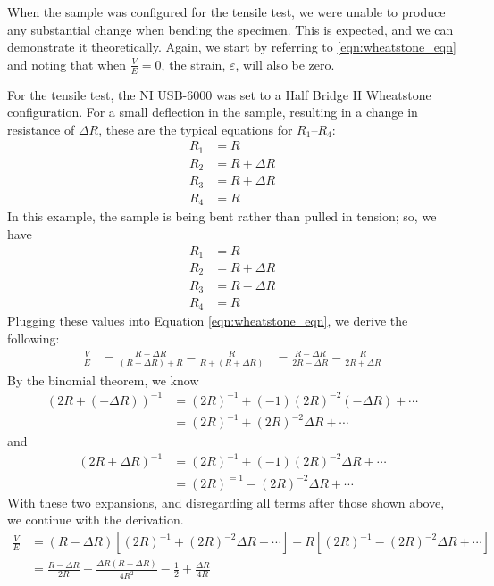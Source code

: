 \documentclass[12 pt]{report}
\begin{document}
\begin{parlist}
	\item When the sample was configured for the tensile test, we were unable to produce any substantial change when bending the specimen. This is expected, and we can demonstrate it theoretically. Again, we start by referring to \ref{eqn:wheatstone_eqn} and noting that when $\frac{V}{E}=0$, the strain, $\varepsilon$, will also be zero.
	
	For the tensile test, the NI USB-6000 was set to a Half Bridge II Wheatstone configuration. For a small deflection in the sample, resulting in a change in resistance of $\Delta{}R$, these are the typical equations for $R_1$--$R_4$:
	\begin{align*}
		R_1&=R\\
		R_2&=R+\Delta{}R\\
		R_3&=R+\Delta{}R\\
		R_4&=R
	\end{align*}
	In this example, the sample is being bent rather than pulled in tension; so, we have
	\begin{align*}
		R_1&=R\\
		R_2&=R+\Delta{}R\\
		R_3&=R-\Delta{}R\\
		R_4&=R
	\end{align*}
	Plugging these values into Equation \ref{eqn:wheatstone_eqn}, we derive the following:
	\begin{align*}
		\frac{V}{E}&=\frac{R-\Delta{}R}{(R-\Delta{}R)+R}-\frac{R}{R+(R+\Delta{}R)}
		&=\frac{R-\Delta{}R}{2R-\Delta{}R}-\frac{R}{2R+\Delta{}R}
	\end{align*}
	By the binomial theorem, we know
	\begin{align*}
		(2R+(-\Delta{}R))^{-1}&=(2R)^{-1}+(-1)(2R)^{-2}(-\Delta{}R)+\cdots\\
		&=(2R)^{-1}+(2R)^{-2}\Delta{}R+\cdots
	\end{align*}
	and
	\begin{align*}
		(2R+\Delta{}R)^{-1}&=(2R)^{-1}+(-1)(2R)^{-2}\Delta{}R+\cdots\\
		&=(2R)^{=1}-(2R)^{-2}\Delta{}R+\cdots
	\end{align*}
	With these two expansions, and disregarding all terms after those shown above, we continue with the derivation.
	\begin{align*}
		\frac{V}{E}&=(R-\Delta{}R)[(2R)^{-1}+(2R)^{-2}\Delta{}R+\cdots]-R[(2R)^{-1}-(2R)^{-2}\Delta{}R+\cdots]\\
		&=\frac{R-\Delta{}R}{2R}+\frac{\Delta{}R(R-\Delta{}R)}{4R^2}-\frac{1}{2}+\frac{\Delta{}R}{4R}\\

\end{align*}
\end{parlist}
\end{document}
